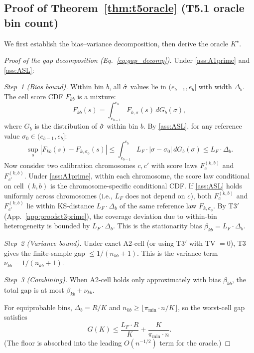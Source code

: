 \subsection{Proof of Theorem~\ref{thm:t5oracle} (T5.1 oracle bin count)}
\label{app:proofs:t5}

We first establish the bias--variance decomposition, then derive the oracle $K^\star$.

\begin{proof}[Proof of the gap decomposition (Eq.~\eqref{eq:gap_decomp})]
Under \ref{ass:A1prime} and \ref{ass:ASL}:

\textit{Step~1 (Bias bound).}
Within bin $b$, all $\hat{\sigma}$ values lie in $(e_{b-1}, e_b]$ with width $\Delta_b$. The cell score CDF $F_{kb}$ is a mixture:
\[
F_{kb}(s) = \int_{e_{b-1}}^{e_b} F_{k,\sigma}(s) \, dG_b(\sigma),
\]
where $G_b$ is the distribution of $\hat{\sigma}$ within bin $b$. By \ref{ass:ASL}, for any reference value $\sigma_0 \in (e_{b-1}, e_b]$:
\[
\sup_s |F_{kb}(s) - F_{k,\sigma_0}(s)|
\leq \int_{e_{b-1}}^{e_b} L_F \cdot |\sigma - \sigma_0| \, dG_b(\sigma)
\leq L_F \cdot \Delta_b.
\]
Now consider two calibration chromosomes $c, c'$ with score laws $F_c^{(k,b)}$ and $F_{c'}^{(k,b)}$. Under \ref{ass:A1prime}, within each chromosome, the score law conditional on cell $(k, b)$ is the chromosome-specific conditional CDF. If \ref{ass:ASL} holds uniformly across chromosomes (i.e., $L_F$ does not depend on $c$), both $F_c^{(k,b)}$ and $F_{c'}^{(k,b)}$ lie within KS-distance $L_F \cdot \Delta_b$ of the same reference law $F_{k,\sigma_0}$. By T3$'$ (App.~\ref{app:proofs:t3prime}), the coverage deviation due to within-bin heterogeneity is bounded by $L_F \cdot \Delta_b$. This is the stationarity bias $\beta_{kb} = L_F \cdot \Delta_b$.

\textit{Step~2 (Variance bound).}
Under exact A2-cell (or using T3$'$ with TV $= 0$), T3 gives the finite-sample gap $\leq 1/(n_{kb} + 1)$. This is the variance term $\nu_{kb} = 1/(n_{kb} + 1)$.

\textit{Step~3 (Combining).}
When A2-cell holds only approximately with bias $\beta_{kb}$, the total gap is at most $\beta_{kb} + \nu_{kb}$.

For equiprobable bins, $\Delta_b = R/K$ and $n_{kb} \geq \lfloor \pi_{\min} \cdot n / K \rfloor$, so the worst-cell gap satisfies
\[
G(K) \leq \frac{L_F \cdot R}{K} + \frac{K}{\pi_{\min} \cdot n}.
\]
(The floor is absorbed into the leading $O(n^{-1/2})$ term for the oracle.)
\end{proof}

